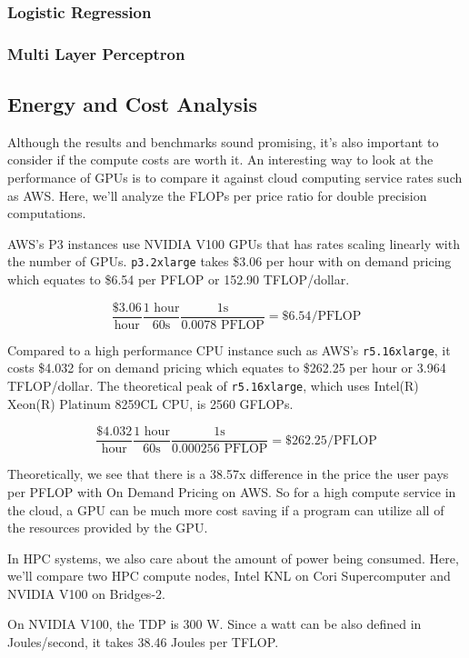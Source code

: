 \documentclass{article}
\begin{document}

\subsubsection{Logistic Regression}

\subsubsection{Multi Layer Perceptron}

\subsection{Energy and Cost Analysis}
Although the results and benchmarks sound promising, it's also important to consider if the compute costs are worth it.
An interesting way to look at the performance of GPUs is to compare it against cloud computing service rates such as AWS. \cite{aws} Here, we'll analyze the FLOPs per price ratio for double precision computations.

AWS's P3 instances use NVIDIA V100 GPUs that has rates scaling linearly with the number of GPUs. \verb|p3.2xlarge| takes \$3.06 per hour with on demand pricing which equates to \$6.54 per PFLOP or 152.90 TFLOP/dollar.

$$\frac{\$3.06}{\textrm{hour}}\frac{1 \textrm{ hour}}{60 \textrm{s}}\frac{1 \textrm{s}}{0.0078\textrm{ PFLOP}} = \$6.54/\textrm{PFLOP}$$


Compared to a high performance CPU instance such as AWS's \verb|r5.16xlarge|, it costs \$4.032 for on demand pricing which equates to \$262.25 per hour or 3.964 TFLOP/dollar. The theoretical peak of \verb|r5.16xlarge|, which uses Intel(R) Xeon(R) Platinum 8259CL CPU, is 2560 GFLOPs.

$$\frac{\$4.032}{\textrm{hour}}\frac{1 \textrm{ hour}}{60 \textrm{s}}\frac{1 \textrm{s}}{0.000256\textrm{ PFLOP}} = \$262.25/\textrm{PFLOP}$$

Theoretically, we see that there is a 38.57x difference in the price the user pays per PFLOP with On Demand Pricing on AWS. So for a high compute service in the cloud, a GPU can be much more cost saving if a program can utilize all of the resources provided by the GPU.

In HPC systems, we also care about the amount of power being consumed. Here, we'll compare two HPC compute nodes, Intel KNL on Cori Supercomputer and NVIDIA V100 on Bridges-2.

On NVIDIA V100, the TDP is 300 W. Since a watt can be also defined in Joules/second, it takes 38.46 Joules per TFLOP. \cite{v100}
\end{document}
